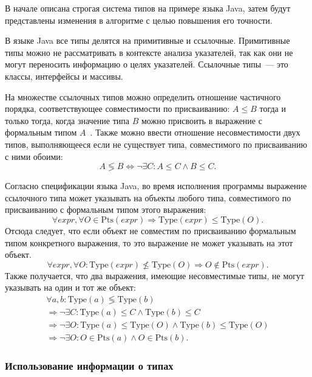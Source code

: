 \documentclass[14pt,titlepage]{extarticle}
\newcommand{\Type}[1]{\textrm{Type}(#1)}
\newcommand{\Pts}[1]{\textrm{Pts}(#1)}
\renewcommand{\leq}{\leqslant}
\begin{document}
      В начале описана строгая система типов на примере языка Java, затем будут
      представлены изменения в алгоритме с целью повышения его точности.

      В языке Java все типы делятся на примитивные и ссылочные.
      Примитивные типы можно не рассматривать в контексте анализа указателей,
      так как они не могут переносить информацию о целях указателей.
      Ссылочные типы~--- это классы, интерфейсы и массивы.

      На множестве ссылочных типов можно определить отношение частичного
      порядка, соответствующее совместимости по присваиванию:
      $A \leq B$ тогда и только тогда, когда значение типа $B$ можно присвоить
      в выражение с формальным типом $A$~\cite{nastia_type_analysis}.
      Также можно ввести отношение несовместимости двух типов, выполняющееся
      если не существует типа, совместимого по присваиванию с ними обоими:
      \[ A \lessgtr B
         \Leftrightarrow
         \lnot \exists C\colon A \leq C \land B \leq C. \]

      Согласно спецификации языка Java, во время исполнения программы выражение
      ссылочного типа может указывать на объекты любого типа, совместимого по
      присваиванию с формальным типом этого выражения:
      \[ \forall expr, \forall O \in \Pts{expr}
         \Rightarrow
         \Type{expr} \leq \Type{O}. \]
      Отсюда следует, что если объект не совместим по присваиванию
      формальным типом конкретного выражения, то это выражение не может
      указывать на этот объект.
      \[ \forall expr, \forall O\colon \Type{expr} \not\leq \Type{O}
         \Rightarrow
         O \not\in \Pts{expr}. \]
      Также получается, что два выражения, имеющие несовместимые типы, не могут
      указывать на один и тот же объект:
      \begin{gather*}
        \forall a, b\colon \Type{a} \lessgtr \Type{b} \\
        \Rightarrow
        \lnot \exists C\colon \Type{a} \leq C \land \Type{b} \leq C \\
        \Rightarrow
        \lnot \exists O\colon \Type{a} \leq \Type{O}
                        \land \Type{b} \leq \Type{O} \\
        \Rightarrow
        \lnot \exists O\colon O \in \Pts{a}
                        \land O \in \Pts{b}.
      \end{gather*}

      \subsubsection{Использование информации о типах}
\end{document}
